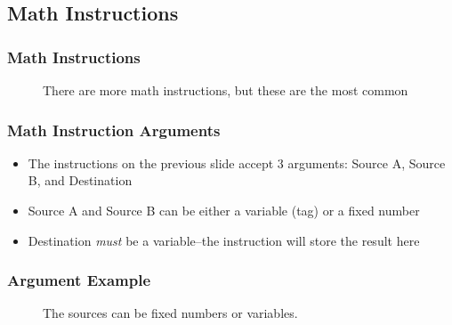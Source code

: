 \subsection{Math Instructions}

\begin{frame}
    \frametitle{Math Instructions}

    \begin{figure}
        \centering
        \resizebox{0.625\linewidth}{!}{
            
        }

        \vspace{0.5em}
        {\footnotesize There are more math instructions, but these are the most common\par}
    \end{figure}
\end{frame}

\begin{frame}
    \frametitle{Math Instruction Arguments}

    \begin{itemize}
        \item The instructions on the previous slide accept 3 arguments: Source A, Source B, and Destination
        \item Source A and Source B can be either a variable (tag) or a fixed number
        \item Destination \emph{must} be a variable--the instruction will store the result here
    \end{itemize}
\end{frame}

\begin{frame}
    \frametitle{Argument Example}

    \begin{figure}
        \centering
        

        \vspace{0.5em}
        {\footnotesize The sources can be fixed numbers or variables.\par}
    \end{figure}
\end{frame}

